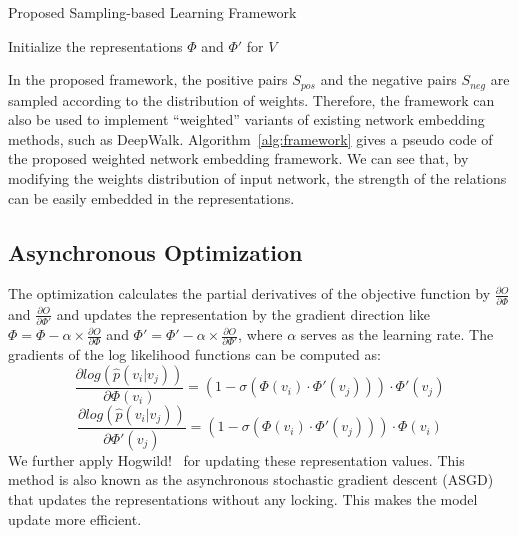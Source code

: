 \begin{algorithm}[htb]
\caption{Proposed Sampling-based Learning Framework}
\label{alg:framework}
\DontPrintSemicolon
{}
Initialize the representations $\Phi$ and $\Phi'$ for $V$\;
\end{algorithm}


In the proposed framework, the positive pairs $S_{pos}$ and the negative pairs $S_{neg}$ are sampled according to the distribution of weights. Therefore, the framework can also be used to implement ``weighted'' variants of existing network embedding methods, such as DeepWalk. Algorithm~\ref{alg:framework} gives a pseudo code of the proposed weighted network embedding framework.  We can see that, by modifying the weights distribution of input network, the strength of the relations can be easily embedded in the representations.



\subsection{Asynchronous Optimization}

The optimization calculates the partial derivatives of the objective function by $\frac{\partial O}{\partial\Phi}$ and $\frac{\partial O}{\partial\Phi'}$ and updates the representation by the gradient direction like $\Phi = \Phi - \alpha \times \frac{\partial O}{\partial\Phi}$ and $\Phi' =
\Phi' - \alpha \times \frac{\partial O}{\partial\Phi'}$, where $\alpha$ serves as the learning rate.  The gradients of the log likelihood functions can be computed as:
\begin{equation}
  \frac{\partial log(\hat{p}(v_{i}|v_{j}))}{\partial \Phi(v_{i})}
  = (1-\sigma(\Phi(v_{i}) \cdot \Phi'(v_{j}))) \cdot \Phi'(v_{j})
\end{equation}
\begin{equation}
  \frac{\partial log(\hat{p}(v_{i}|v_{j}))}{\partial \Phi'(v_{j})}
  = (1-\sigma(\Phi(v_{i}) \cdot \Phi'(v_{j}))) \cdot \Phi(v_{i})
\end{equation}
We further apply Hogwild!~\cite{ASGD} for updating these representation values. This method is also known as the asynchronous stochastic gradient descent (ASGD) that updates the representations without any locking.  This makes the model update more efficient.


